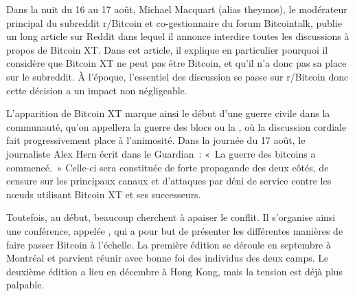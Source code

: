 Dans la nuit du 16 au 17 août, Michael Macquart (alias theymos), le modérateur principal du subreddit r/Bitcoin et co-gestionnaire du forum Bitcointalk, publie un long article sur Reddit dans lequel il annonce interdire toutes les discussions à propos de Bitcoin XT. Dans cet article, il explique en particulier pourquoi il considère que Bitcoin XT ne peut pas être Bitcoin, et qu'il n'a donc pas sa place sur le subreddit. À l'époque, l'essentiel des discussion se passe sur r/Bitcoin donc cette décision a un impact non négligeable.

L'apparition de Bitcoin XT marque ainsi le début d'une guerre civile dans la communauté, qu'on appellera la guerre des blocs ou la , où la discussion cordiale fait progressivement place à l'animosité. Dans la journée du 17 août, le journaliste Alex Hern écrit dans le Guardian~: «~La guerre des bitcoins a commencé.~» Celle-ci sera constituée de forte propagande des deux côtés, de censure sur les principaux canaux et d'attaques par déni de service contre les nœuds utilisant Bitcoin XT et ses successeurs.

Toutefois, au début, beaucoup cherchent à apaiser le conflit. Il s'organise ainsi une conférence, appelée , qui a pour but de présenter les différentes manières de faire passer Bitcoin à l'échelle. La première édition se déroule en septembre à Montréal et parvient réunir avec bonne foi des individus des deux camps. Le deuxième édition a lieu en décembre à Hong Kong, mais la tension est déjà plus palpable.

